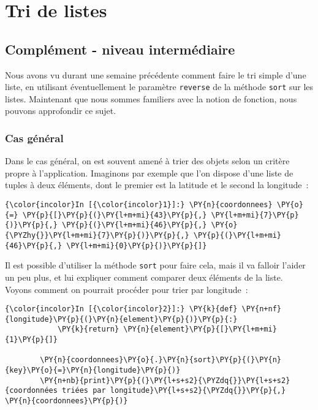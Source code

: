     \hypertarget{tri-de-listes}{%
\section{Tri de listes}\label{tri-de-listes}}

    \hypertarget{compluxe9ment---niveau-intermuxe9diaire}{%
\subsection{Complément - niveau
intermédiaire}\label{compluxe9ment---niveau-intermuxe9diaire}}

    Nous avons vu durant une semaine précédente comment faire le tri simple
d'une liste, en utilisant éventuellement le paramètre \texttt{reverse}
de la méthode \texttt{sort} sur les listes. Maintenant que nous sommes
familiers avec la notion de fonction, nous pouvons approfondir ce sujet.

    \hypertarget{cas-guxe9nuxe9ral}{%
\subsubsection{Cas général}\label{cas-guxe9nuxe9ral}}

    Dans le cas général, on est souvent amené à trier des objets selon un
critère propre à l'application. Imaginons par exemple que l'on dispose
d'une liste de tuples à deux éléments, dont le premier est la latitude
et le second la longitude~:

    \begin{Verbatim}[commandchars=\\\{\}]
{\color{incolor}In [{\color{incolor}1}]:} \PY{n}{coordonnees} \PY{o}{=} \PY{p}{[}\PY{p}{(}\PY{l+m+mi}{43}\PY{p}{,} \PY{l+m+mi}{7}\PY{p}{)}\PY{p}{,} \PY{p}{(}\PY{l+m+mi}{46}\PY{p}{,} \PY{o}{\PYZhy{}}\PY{l+m+mi}{7}\PY{p}{)}\PY{p}{,} \PY{p}{(}\PY{l+m+mi}{46}\PY{p}{,} \PY{l+m+mi}{0}\PY{p}{)}\PY{p}{]}
\end{Verbatim}


    Il est possible d'utiliser la méthode \texttt{sort} pour faire cela,
mais il va falloir l'aider un peu plus, et lui expliquer comment
comparer deux éléments de la liste.\\

Voyons comment on pourrait procéder pour trier par longitude~:

    \begin{Verbatim}[commandchars=\\\{\}]
{\color{incolor}In [{\color{incolor}2}]:} \PY{k}{def} \PY{n+nf}{longitude}\PY{p}{(}\PY{n}{element}\PY{p}{)}\PY{p}{:} 
            \PY{k}{return} \PY{n}{element}\PY{p}{[}\PY{l+m+mi}{1}\PY{p}{]}
        
        \PY{n}{coordonnees}\PY{o}{.}\PY{n}{sort}\PY{p}{(}\PY{n}{key}\PY{o}{=}\PY{n}{longitude}\PY{p}{)}
        \PY{n+nb}{print}\PY{p}{(}\PY{l+s+s2}{\PYZdq{}}\PY{l+s+s2}{coordonnées triées par longitude}\PY{l+s+s2}{\PYZdq{}}\PY{p}{,} \PY{n}{coordonnees}\PY{p}{)}
\end{Verbatim}


